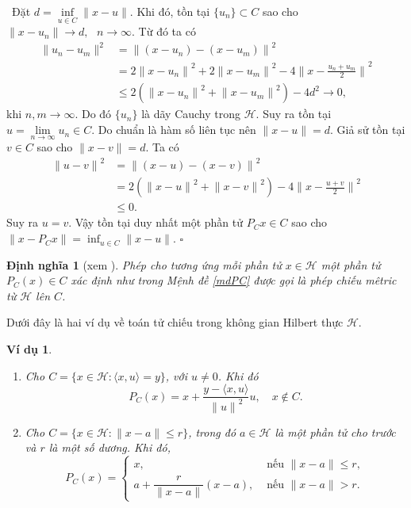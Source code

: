 \documentclass[14pt, oneside,A4paper]{book}
\theoremstyle{plain}
\newcommand{\eproof}{\hfill $\square$}
\newcommand{\chm}{{\bf  Chứng minh.}}
\newtheorem{vd}[theorem]{\bf Ví dụ}
\newtheorem{dn}[theorem]{\bf Định nghĩa}
\begin{document}
\noindent \chm \rm  \ Đặt $d= \inf\limits_{u\in C} \|x-u\|$. Khi đó, tồn tại $\{u_n\} \subset C$ sao cho $\|x-u_n\|\longrightarrow d,\text{ } n\longrightarrow\infty$. Từ đó ta có
	\begin{align*}
	{\|u_n-u_m}\|^2 &= {\|(x-u_n)-(x-u_m)\|}^2\\
	&= 2{\|x-u_n\|}^2 + 2{\|x-u_m\|}^2 - 4{\Big \|x-\frac{u_n+u_m}{2}\Big \|}^2\\
	&\leq 2({\|x-u_n\|}^2 + {\|x-u_m\|}^2) - 4d^2 \longrightarrow 0, 
	\end{align*}
	khi $n,m\longrightarrow \infty.$ Do đó $\{u_n\}$ là dãy Cauchy trong $\mathcal H$. Suy ra tồn tại $u= \lim\limits_{n\rightarrow \infty} u_n \in C$.
	Do chuẩn là hàm số liên tục nên $\|x-u\| = d$.
	Giả sử tồn tại $v\in C$ sao cho $\|x-v\|=d$. Ta có
	\begin{align*}
	{\|u-v\|}^2 &={\|(x-u)-(x-v)\|}^2\\
	&= 2({\|x-u\|}^2+{\|x-v\|}^2)-4{\Big \|x- \frac{u+v}{2} \Big \|}^2\\
	&\leq 0.
	\end{align*} 
	Suy ra $u=v$. Vậy tồn tại duy nhất một phần tử $P_Cx\in C$ sao cho $\|x-P_Cx\|=\inf_{u\in C}\|x-u\|.$
\eproof

\begin{dn}[xem \cite{AS}]\rm  Phép cho tương ứng mỗi phần tử $x\in \mathcal H$ một phần tử $P_C(x)\in C$ xác định như trong Mệnh đề \ref{mdPC} được gọi là phép chiếu mêtric từ $\mathcal H$ lên $C$.
\end{dn}

Dưới đây là hai ví dụ về toán tử chiếu trong không gian Hilbert thực $\mathcal H $.

\begin{vd}\rm 
	\begin{enumerate}
		\item[(a)] Cho $C=\{x\in \mathcal H:\langle x,u\rangle = y\}$, với $u\neq 0$. Khi đó $$P_C(x)=x+\dfrac{y-\langle x,u\rangle}{{\|u\|}^2} u, \quad x\notin C.$$
		\item[(b)] Cho $C=\{x\in \mathcal H: \|x-a\|\leq r\}$, trong đó $a\in \mathcal H$ là một phần tử cho trước và $r$ là một số dương. Khi đó, 
		$$P_C(x)=
		\begin{cases}
		x,& \text{ nếu }\|x-a\|\leq r,\\
		a+\dfrac{r}{\|x-a\|}(x-a) , &\text{ nếu }\|x-a\|> r.
		\end{cases}
		$$
	\end{enumerate}
\end{vd}
\end{document}
